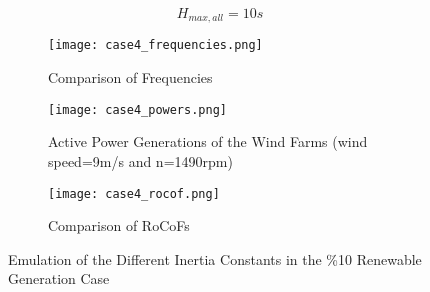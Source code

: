 \begin{equation}
\label{hmax22}
H_{max,all}=10s
\end{equation}
\begin{figure}[h!]
	\centering
	\begin{subfigure}{0.9\textwidth} %
		\centering	\texttt{[image: case4\_frequencies.png]}
		\caption{Comparison of Frequencies}		
		\label{Case4_freq}
	\end{subfigure}
\vspace{0.1em} %
\begin{subfigure}{0.9\textwidth}
	\centering	
	\texttt{[image: case4\_powers.png]}
	\caption{Active Power Generations of the Wind Farms (wind speed=9m/s and n=1490rpm)}
	\label{Case4_power}	
\end{subfigure}
	\vspace{0.1em} %
	\begin{subfigure}{0.9\textwidth}
		\centering	\texttt{[image: case4\_rocof.png]}
		\caption{Comparison of RoCoFs}
		\label{Case4_rocof}	
	\end{subfigure}
	\caption{Emulation of the Different Inertia Constants in the \%10 Renewable Generation Case}
\end{figure}

